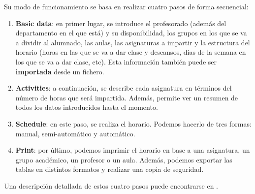 Su modo de funcionamiento se basa en realizar cuatro pasos de forma secuencial:

\begin{enumerate}[1.]
    \item \textbf{Basic data}: en primer lugar, se introduce el profesorado (además del departamento en el que está) y su disponibilidad, los grupos en los que se va a dividir al alumnado, las aulas, las asignaturas a impartir y la estructura del horario (horas en las que se va a dar clase y descansos, días de la semana en los que se va a dar clase, etc). Esta información también puede ser \textbf{importada} desde un fichero.
    \item \textbf{Activities}: a continuación, se describe cada asignatura en términos del número de horas que será impartida. Además, permite ver un resumen de todos los datos introducidos hasta el momento.
    \item \textbf{Schedule}: en este paso, se realiza el horario. Podemos hacerlo de tres formas: manual, semi-automático y automático. 
    \item \textbf{Print}: por último, podemos imprimir el horario en base a una asignatura, un grupo académico, un profesor o un aula. Además, podemos exportar las tablas en distintos formatos y realizar una copia de seguridad.
\end{enumerate}

Una descripción detallada de estos cuatro pasos puede encontrarse en \cite{timetabler}.
